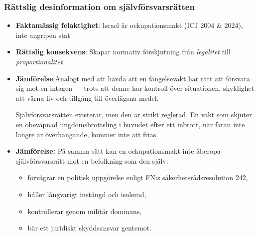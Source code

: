 \subsubsection{Rättslig desinformation om självförsvarsrätten}
\begin{itemize}
\item \textbf{Faktamässig felaktighet}: Israel är ockupationsmakt (ICJ 2004 \& 2024), inte angripen stat
\item \textbf{Rättslig konsekvens}: Skapar normativ förskjutning från \textit{legalitet} till \textit{proportionalitet}
\item \textbf{Jämförelse}:Analogt med att hävda att en fängelsevakt har rätt att försvara sig mot en intagen — trots att denne har kontroll över situationen, skyldighet att värna liv och tillgång till överlägsna medel.

Självförsvarsrätten existerar, men den är strikt reglerad. En vakt som skjuter en obeväpnad ungdomsbrottsling i huvudet efter ett inbrott, när faran inte längre är överhängande, kommer inte att frias.

\item \textbf{Jämförelse:} På samma sätt kan en ockupationsmakt inte åberopa självförsvarsrätt mot en befolkning som den själv:
  \begin{itemize}
    \item förvägrar en politisk uppgörelse enligt FN:s säkerhetsrådsresolution 242,
    \item håller långvarigt instängd och isolerad,
    \item kontrollerar genom militär dominans,
    \item bär ett juridiskt skyddsansvar gentemot.
  \end{itemize}

\end{itemize}

